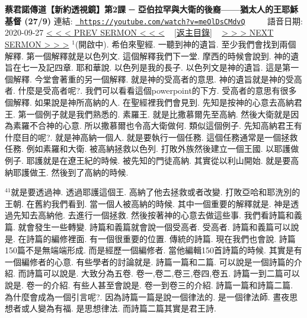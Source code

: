 \documentclass{book}
\begin{document}
\section{}
\label{sec:meOlDsCMdvQ}
\textbf{蔡君諾傳道【新約透視鏡】第2課 ─ 亞伯拉罕與大衛的後裔——猶太人的王耶穌基督 (27/9)}
\newline
\newline
連結: \href{https://youtube.com/watch?v=meOlDsCMdvQ}{\texttt{ https://youtube.com/watch?v=meOlDsCMdvQ}} ~~~~ 語音日期: 2020-09-27 
\newline
\newline
\hyperref[sec:6Yg3FVlhsxs]{\small{< < < PREV SERMON < < <}}
~
\hyperref[sec:index]{\small{[返主目錄]}}
~
\hyperref[sec:FpXj_b1Te98]{\small{> > > NEXT SERMON > > >}}
\newline
\newline
$^{1}$(開啟中).
希伯來聖經.
一聽到神的遺旨.
至少我們會找到兩個解釋.
第一個解釋就是以色列文.
這個解釋我們下一堂.
摩西的時候會說到.
神的遺旨在七一及記四章.
耶和華說.
以色列是我的長子.
以色列文是神的遺旨.
這是第一個解釋.
今堂會著重的另一個解釋.
就是神的受高者的意思.
神的遺旨就是神的受高者.
什麼是受高者呢?.
我們可以看看這個powerpoint的下方.
受高者的意思有很多個解釋.
如果說是神所高納的人.
在聖經裡我們會見到.
先知是按神的心意去高納君王.
第一個例子就是我們熟悉的.
素羅王.
就是比撒慕爾先至高納.
然後大衛就是因為素羅不合神的心意.
所以撒慕爾也令高大衛做何.
類似這個例子.
先知高納君王有什麼目的呢?.
就是神高納一個人.
就是要執行一個任務.
這個任務通常是一個拯救任務.
例如素羅和大衛.
被高納拯救以色列.
打敗外族然後建立一個王國.
以耶護做例子.
耶護就是在遼王紀的時候.
被先知的門徒高納.
其實從以利山開始.
就是要高納耶護做王.
然後到了高納的時候.

$^{41}$就是要透過神.
透過耶護這個王.
高納了他去拯救或者改變.
打敗亞哈和耶洗別的王朝.
在舊約我們看到.
當一個人被高納的時候.
其中一個重要的解釋就是.
神是透過先知去高納他.
去進行一個拯救.
然後按著神的心意去做這些事.
我們看詩篇和義篇.
就會發生一些轉變.
詩篇和義篇就會說一個受高者.
受高者.
詩篇和義篇可以說是.
在詩篇的編修裡面.
有一個很重要的位置.
傳統的詩篇.
現在我們也會說.
詩篇150篇不是無端端形成.
而是經歷一個編修者.
當他編輯150首詩篇的時候.
其實是有一個編修者的心意.
有些學者的討論就是.
詩篇一篇和二篇.
可以說是一個詩篇的介紹.
而詩篇可以說是.
大致分為五卷.
卷一,卷二,卷三,卷四,卷五.
詩篇一到二篇可以說是.
卷一的介紹.
有些人甚至會說是.
卷一到卷三的介紹.
詩篇一篇和詩篇二篇.
為什麼會成為一個引言呢?.
因為詩篇一篇是說一個律法的.
是一個律法師.
晝夜思想者或人變為有福.
是思想律法.
而詩篇二篇其實是君王詩.
\end{document}
